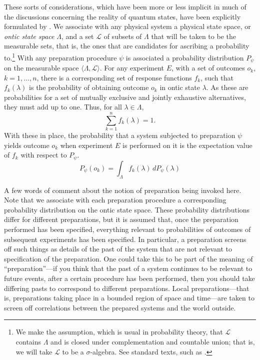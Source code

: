 \documentclass[12pt]{article}
\newcommand{\mc}{\mathcal}
\begin{document}
These sorts of considerations, which have been more or less implicit in much of the discussions concerning the reality of quantum states, have been explicitly formulated by \citet{SpekkensHarrigan}.  We associate with any physical system a  physical state space, or \emph{ontic state space} $\Lambda$, and a set $\mc{L}$ of subsets of $\Lambda$ that will be taken to be the measurable sets, that is, the ones that are candidates for ascribing a probability to.\footnote{We make the assumption, which is usual in probability theory, that $\mc{L}$ contains $\Lambda$  and is closed under complementation and countable union; that is, we will take  $\mc{L}$ to be a $\sigma$-algebra.  See standard texts, such as \citet{Billing}. } With any preparation procedure $\psi$ is associated a probability distribution $P_\psi$ on the measurable space $\langle \Lambda, \mc{L} \rangle$.  For any  experiment $E$, with a set of outcomes $o_k$, $k = 1, \ldots, n$, there is a corresponding set of response functions $f_k$, such that $f_k(\lambda)$ is the probability of obtaining outcome $o_k$ in ontic state $\lambda$.  As these are probabilities for a set of mutually exclusive and jointly exhaustive alternatives, they must add up to one.  Thus, for all $\lambda \in \Lambda$,
\begin{equation}
\sum_{k = 1}^n f_k(\lambda) = 1.
\end{equation}
With these in place, the probability that a system subjected to preparation $\psi$ yields outcome $o_k$ when experiment $E$ is performed on it is the expectation value of $f_k$ with respect to $P_\psi$.
\begin{equation}
P_\psi(o_k) = \int_\Lambda f_k(\lambda) \, dP_\psi(\lambda)
\end{equation}

A few words of comment about the notion of preparation being invoked here.  Note that we associate with each preparation procedure  a corresponding probability distribution on the ontic state space. These probability distributions differ for different preparations, but it is assumed that, once the preparation performed has been specified, everything relevant to probabilities of outcomes of subsequent experiments has been specified.  In particular, a preparation screens off such things as details of the past of the system that are not relevant to specification of the preparation.  One could take this to be part of the meaning of ``preparation''---if you think that the past of a system continues to be relevant to future events, after a certain procedure has been performed, then you should take differing pasts to correspond to different preparations.  Local preparations---that is, preparations taking place in a bounded region of space and time---are taken to screen off correlations between the prepared systems and the world outside.
\end{document}
